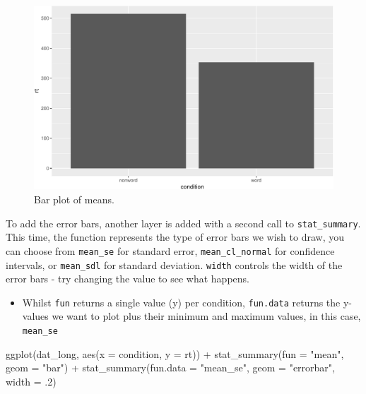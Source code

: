\documentclass[
  english,
  doc,floatsintext]{apa6}
\newenvironment{Shaded}{\begin{snugshade}}{\end{snugshade}}
\newcommand{\AttributeTok}[1]{\textcolor[rgb]{0.77,0.63,0.00}{#1}}
\newcommand{\DecValTok}[1]{\textcolor[rgb]{0.00,0.00,0.81}{#1}}
\newcommand{\FunctionTok}[1]{\textcolor[rgb]{0.00,0.00,0.00}{#1}}
\newcommand{\NormalTok}[1]{#1}
\newcommand{\SpecialCharTok}[1]{\textcolor[rgb]{0.00,0.00,0.00}{#1}}
\newcommand{\StringTok}[1]{\textcolor[rgb]{0.31,0.60,0.02}{#1}}
\providecommand{\tightlist}{%
  \setlength{\itemsep}{0pt}\setlength{\parskip}{0pt}}
\begin{document}
\begin{figure}

{\centering \includegraphics[width=1\linewidth]{images/badbar1-1} 

}

\caption{Bar plot of means.}\label{fig:badbar1}
\end{figure}

To add the error bars, another layer is added with a second call to \texttt{stat\_summary}. This time, the function represents the type of error bars we wish to draw, you can choose from \texttt{mean\_se} for standard error, \texttt{mean\_cl\_normal} for confidence intervals, or \texttt{mean\_sdl} for standard deviation. \texttt{width} controls the width of the error bars - try changing the value to see what happens.

\begin{itemize}
\tightlist
\item
  Whilst \texttt{fun} returns a single value (y) per condition, \texttt{fun.data} returns the y-values we want to plot plus their minimum and maximum values, in this case, \texttt{mean\_se}
\end{itemize}

\begin{Shaded}
\begin{Highlighting}[]
\FunctionTok{ggplot}\NormalTok{(dat\_long, }\FunctionTok{aes}\NormalTok{(}\AttributeTok{x =}\NormalTok{ condition, }\AttributeTok{y =}\NormalTok{ rt)) }\SpecialCharTok{+}
  \FunctionTok{stat\_summary}\NormalTok{(}\AttributeTok{fun =} \StringTok{"mean"}\NormalTok{, }\AttributeTok{geom =} \StringTok{"bar"}\NormalTok{) }\SpecialCharTok{+}
  \FunctionTok{stat\_summary}\NormalTok{(}\AttributeTok{fun.data =} \StringTok{"mean\_se"}\NormalTok{, }
               \AttributeTok{geom =} \StringTok{"errorbar"}\NormalTok{, }
               \AttributeTok{width =}\NormalTok{ .}\DecValTok{2}\NormalTok{)}
\end{Highlighting}
\end{Shaded}
\end{document}
